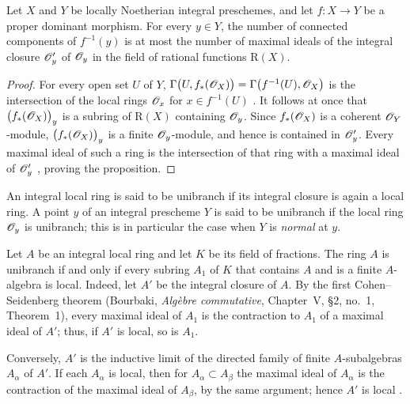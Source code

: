 \begin{proposition}[4.3.5]
\label{III.4.3.5}
Let $X$ and $Y$ be locally Noetherian integral preschemes, and let
$f:X\to Y$ be a proper dominant morphism.  For every $y\in Y$, the
number of connected components of $f^{-1}(y)$ is at most the number
of maximal ideals of the integral closure $\mathscr{O}'_y$ of
$\mathscr{O}_y$ in the field of rational functions $\mathrm{R}(X)$.
\end{proposition}

\begin{proof}
For every open set $U$ of $Y$, $\Gamma\bigl(U,f_*(\mathscr{O}_X)\bigr)
=
\Gamma\bigl(f^{-1}(U),\mathscr{O}_X\bigr)$
is the intersection of the local rings $\mathscr{O}_x$ for
$x\in f^{-1}(U)$ .  It follows at once that
$\bigl(f_*(\mathscr{O}_X)\bigr)_y$ is a subring of $\mathrm{R}(X)$ containing
$\mathscr{O}_y$.  Since $f_*(\mathscr{O}_X)$ is a coherent
$\mathscr{O}_Y$-module, $\bigl(f_*(\mathscr{O}_X)\bigr)_y$ is a finite
$\mathscr{O}_y$-module, and hence is contained in $\mathscr{O}'_y$.
Every maximal ideal of such a ring is the intersection of that ring
with a maximal ideal of $\mathscr{O}'_y$
\cite[vol.~I, pp.~257 and 259]{I-13}, proving the proposition.
\end{proof}

\begin{definition}[4.3.6]
\label{III.4.3.6}
An integral local ring is said to be unibranch if its integral
closure is again a local ring.  A point $y$ of an integral prescheme
$Y$ is said to be unibranch if the local ring $\mathscr{O}_y$ is
unibranch; this is in particular the case when $Y$ is \emph{normal} at
$y$.
\end{definition}

Let $A$ be an integral local ring and let $K$ be its field of
fractions.  The ring $A$ is unibranch if and only if every subring
$A_1$ of $K$ that contains $A$ and is a finite $A$-algebra is
local.  Indeed, let $A'$ be the integral closure of $A$.  By the
first Cohen--Seidenberg theorem (Bourbaki, \emph{Alg\`ebre
commutative}, Chapter~V, \S2, no.~1, Theorem~1), every maximal ideal
of $A_1$ is the contraction to $A_1$ of a maximal ideal of $A'$;
thus, if $A'$ is local, so is $A_1$.


Conversely, $A'$ is the inductive limit of the directed family of
finite $A$-subalgebras $A_\alpha$ of $A'$.  If each $A_\alpha$ is
local, then for $A_\alpha\subset A_\beta$ the maximal ideal of
$A_\alpha$ is the contraction of the maximal ideal of $A_\beta$, by
the same argument; hence $A'$ is local
.

